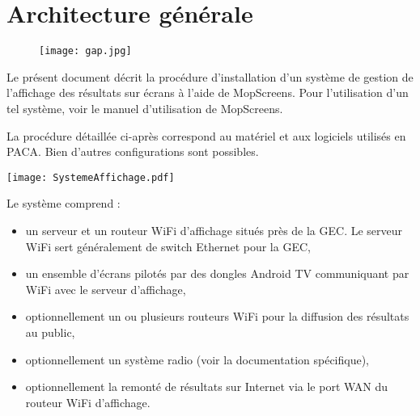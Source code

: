 \documentclass[a4paper]{ffco-rapport}
\begin{document}
	\couverture
	

	

\chapter{Architecture générale}
	
\begin{figure}[!ht]
	\centering
		\texttt{[image: gap.jpg]}
	\label{fig:g}
\end{figure}

\vspace{5mm}

Le présent document décrit la procédure d'installation d'un système de gestion de l'affichage des résultats sur écrans à l'aide de MopScreens.
Pour l'utilisation d'un tel système, voir le manuel d'utilisation de MopScreens.

La procédure détaillée ci-après correspond au matériel et aux logiciels utilisés en PACA. Bien d'autres configurations sont possibles.

\texttt{[image: SystemeAffichage.pdf]}

Le système comprend :
\begin{itemize}
	\item un serveur et un routeur WiFi d'affichage situés près de la GEC. Le serveur WiFi sert généralement de switch Ethernet pour la GEC,
	\item un ensemble d'écrans pilotés par des dongles Android TV communiquant par WiFi avec le serveur d'affichage,
	\item optionnellement un ou plusieurs routeurs WiFi pour la diffusion des résultats au public,
	\item optionnellement un système radio (voir la documentation spécifique),
	\item optionnellement la remonté de résultats sur Internet via le port WAN du routeur WiFi d'affichage.
\end{itemize}
\end{document}
